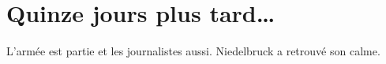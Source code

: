 \chapter{Quinze jours plus tard\ldots{}}
L'armée est partie et les journalistes aussi. Niedelbruck a retrouvé son calme.
